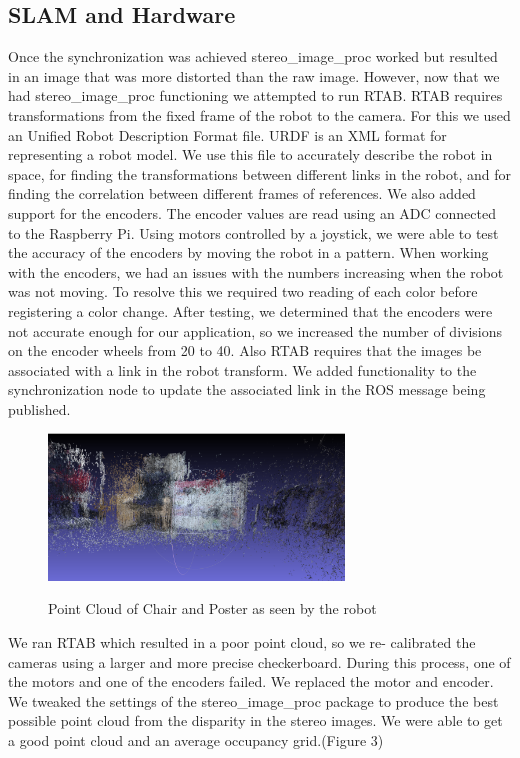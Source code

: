 \documentclass[10pt]{article}
\begin{document}
\subsection{SLAM and Hardware}
Once the synchronization was achieved stereo\_image\_proc worked but resulted in an image that was more distorted than the raw image. However, now that we had stereo\_image\_proc functioning we attempted to run RTAB. RTAB requires transformations from the fixed frame of the robot to the camera. For this we used an Unified Robot Description Format file. URDF is an XML format for representing a robot model. We use this file to accurately describe the robot in space, for finding the transformations between different links in the robot, and for finding the correlation between different frames of references. We also added support for the encoders. The encoder values are read using an ADC connected to the Raspberry Pi. Using motors controlled by a joystick, we were able to test the accuracy of the encoders by moving the robot in a pattern. When working with the encoders, we had an issues with the numbers increasing when the robot was not moving. To resolve this we required two reading of each color before registering a color change. After testing, we determined that the encoders were not accurate enough for our application, so we increased the number of divisions on the encoder wheels from 20 to 40. Also RTAB requires that the images be associated with a link in the robot transform. We added functionality to the synchronization node to update the associated link in the ROS message being published. 

\begin{figure}[!h]
\centering \includegraphics[width=0.7\textwidth]{PointCloud.png}\label{Point Cloud}
\caption{Point Cloud of Chair and Poster as seen by the robot}
\end{figure}

We ran RTAB which resulted in a poor point cloud, so we re- calibrated the cameras using a larger and more precise checkerboard. During this process, one of the motors and one of the encoders failed. We replaced the motor and encoder. We tweaked the settings of the stereo\_image\_proc package to produce the best possible point cloud from the disparity in the stereo images. We were able to get a good point cloud and an average occupancy grid.(Figure 3)
\end{document}
